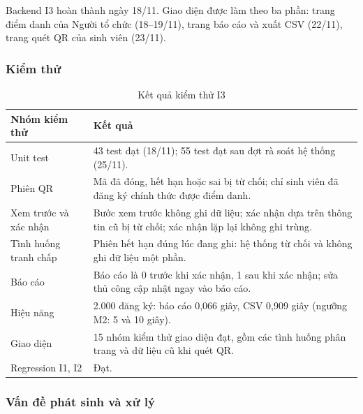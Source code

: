 Backend I3 hoàn thành ngày 18/11. Giao diện được làm theo ba phần: trang điểm danh của Người tổ chức (18--19/11), trang báo cáo và xuất CSV (22/11), trang quét QR của sinh viên (23/11).

\subsubsection{Kiểm thử}

\begin{table}[H]
\centering\small
\caption{Kết quả kiểm thử I3}\label{tab:i3-tests}
\begin{tabularx}{\linewidth}{@{}p{.22\linewidth}X@{}}
\toprule
\textbf{Nhóm kiểm thử} & \textbf{Kết quả}\\\midrule
Unit test & 43 test đạt (18/11); 55 test đạt sau đợt rà soát hệ thống (25/11).\\
Phiên QR & Mã đã đóng, hết hạn hoặc sai bị từ chối; chỉ sinh viên đã đăng ký chính thức được điểm danh.\\
Xem trước và xác nhận & Bước xem trước không ghi dữ liệu; xác nhận dựa trên thông tin cũ bị từ chối; xác nhận lặp lại không ghi trùng.\\
Tình huống tranh chấp & Phiên hết hạn đúng lúc đang ghi: hệ thống từ chối và không ghi dữ liệu một phần.\\
Báo cáo & Báo cáo là 0 trước khi xác nhận, 1 sau khi xác nhận; sửa thủ công cập nhật ngay vào báo cáo.\\
Hiệu năng & 2.000 đăng ký: báo cáo 0,066 giây, CSV 0,909 giây (ngưỡng M2: 5 và 10 giây).\\
Giao diện & 15 nhóm kiểm thử giao diện đạt, gồm các tình huống phân trang và dữ liệu cũ khi quét QR.\\
Regression I1, I2 & Đạt.\\
\bottomrule
\end{tabularx}
\end{table}

\subsubsection{Vấn đề phát sinh và xử lý}

